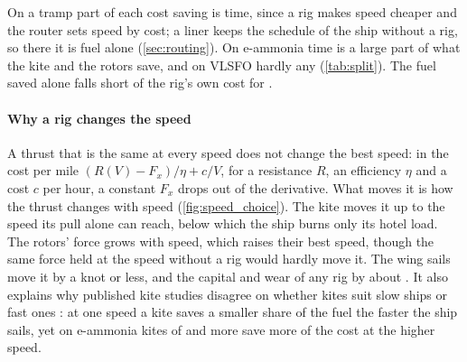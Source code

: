 \begin{table}[tbp]
\centering
\footnotesize
\caption{Cost saving of the best size of each rig compared with each drive, the mean over the classes and routes, in points of the cost of the ship without a rig. It is split into the fuel the rig saves, the time it saves at the crew, capital and cargo interest of the ship without a rig, and the rig's own cost and the cargo it displaces. Beside it stands the cost saving with every goal at what is known today (\cref{tab:goals}) , for the best of the sizes run on the routes found at the goals, which understates it a little (\cref{sec:res_missed}). The last columns give the share of round trips the rig shortens and the median change of their duration. Blue shading marks what a rig gains, red what it costs, the deeper the larger within its column. \savingerror}
\label{tab:split}
\end{table}

On a tramp part of each cost saving is time, since a rig makes speed cheaper and the router sets speed by cost; a liner keeps the schedule of the ship without a rig, so there it is fuel alone (\cref{sec:routing}). On e-ammonia time is a large part of what the kite and the rotors save, and on VLSFO hardly any (\cref{tab:split}). The fuel saved alone falls short of the rig's own cost for \NumFuelShort{}. 

\paragraph{Why a rig changes the speed}\label{sec:res_speed} A thrust that is the same at every speed does not change the best speed: in the cost per mile $(R(V)-F_x)/\eta + c/V$, for a resistance $R$, an efficiency $\eta$ and a cost $c$ per hour, a constant $F_x$ drops out of the derivative. What moves it is how the thrust changes with speed (\cref{fig:speed_choice}). The kite moves it up to the speed its pull alone can reach, below which the ship burns only its hotel load. The rotors' force grows with speed, which raises their best speed, though the same force held at the speed without a rig would hardly move it. The wing sails move it by a knot or less, and the capital and wear of any rig by about . It also explains why published kite studies disagree on whether kites suit slow ships \citep{cedelft2016} or fast ones \citep{emsa2023}: at one speed a kite saves a smaller share of the fuel the faster the ship sails, yet on e-ammonia kites of  and more save more of the cost at the higher speed.

